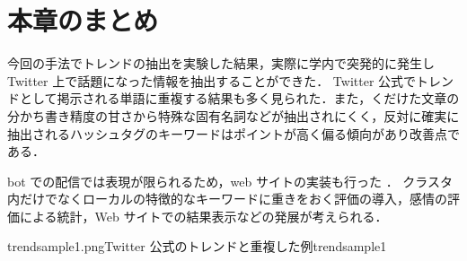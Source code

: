 

\section{本章のまとめ}
今回の手法でトレンドの抽出を実験した結果，実際に学内で突発的に発生し Twitter 上で話題になった情報を抽出することができた．
Twitter 公式でトレンドとして掲示される単語に重複する結果も多く見られた．また，くだけた文章の分かち書き精度の甘さから特殊な固有名詞などが抽出されにくく，反対に確実に抽出されるハッシュタグのキーワードはポイントが高く偏る傾向があり改善点である．

bot での配信では表現が限られるため，web サイトの実装も行った \cite{trend_elzup_com}．
クラスタ内だけでなくローカルの特徴的なキーワードに重きをおく評価の導入，感情の評価による統計，Web サイトでの結果表示などの発展が考えられる．


{trendsample1.png}{Twitter 公式のトレンドと重複した例}{trendsample1}


\newpage
